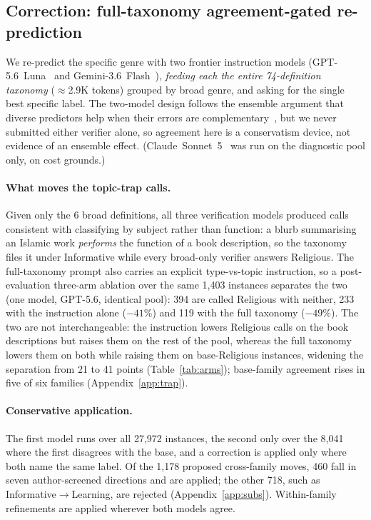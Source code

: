 \documentclass[11pt]{article}
\begin{document}
\subsection{Correction: full-taxonomy agreement-gated re-prediction}
We re-predict the specific genre with two frontier instruction models
(GPT-5.6~Luna~\citep{gpt56luna2026} and Gemini-3.6~Flash~\citep{gemini36flash2026}),
\emph{feeding each the entire 74-definition taxonomy} ($\approx$2.9K tokens) grouped by
broad genre, and asking for the single best specific label. The two-model design follows the
ensemble argument that diverse predictors help when their errors are
complementary~\citep{dietterich2000ensemble,verga2024poll,wang2024moa}, but we never submitted
either verifier alone, so agreement here is a conservatism device, not evidence of an ensemble
effect. (Claude~Sonnet~5~\citep{sonnet5_2026} was run on the diagnostic
pool only, on cost grounds.)

\paragraph{What moves the topic-trap calls.} Given only the 6 broad definitions, all three
verification models produced calls consistent with classifying by subject rather than function: a blurb summarising an Islamic
work \emph{performs} the function of a book description, so the taxonomy files it under
Informative while every broad-only verifier answers Religious. The full-taxonomy prompt also carries an explicit type-vs-topic instruction, so a
post-evaluation three-arm ablation over the same 1{,}403 instances separates the two (one model,
GPT-5.6, identical pool): 394 are called Religious with neither, 233 with the instruction alone
($-41\%$) and 119 with the full taxonomy ($-49\%$). The two are not interchangeable: the
instruction lowers Religious calls on the book descriptions but raises them on the rest of the
pool, whereas the full taxonomy lowers them on both while raising them on base-Religious
instances, widening the separation from 21 to 41 points (Table~\ref{tab:arms}); base-family
agreement rises in five of six families (Appendix~\ref{app:trap}).

\paragraph{Conservative application.} The first model runs over all 27{,}972 instances, the
second only over the 8{,}041 where the first disagrees with the base, and a correction is
applied only where both name the same label. Of the 1{,}178 proposed cross-family moves, 460
fall in seven author-screened directions and are applied; the other 718, such as
Informative$\rightarrow$Learning, are rejected (Appendix~\ref{app:subs}). Within-family refinements are applied wherever both models
agree.
\end{document}
